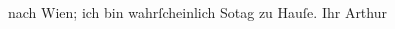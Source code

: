 \begin{ledgroupsized}[t]{13cm}
                    nach Wien; ich bin wahrſcheinlich So{\geminationn}tag zu Hauſe.\pend
           \pstart Ihr \spacefill\mbox{Arthur}\pend{}\pstart
           \noindent{}\label{T_L00842_1v}\label{T_L00842_1h}\pend
           \endnumbering{}\end{ledgroupsized}  \newcommand{\dateiname}{L00842}\newcommand{\titel}{Arthur Schnitzler an Hugo von Hofmannsthal, 31. 8. 1898}\newcommand{\editorInnen}{Martin Anton Müller und Gerd-Hermann Susen}
            \footnotesize
\begin{ledgroupsized}[t]{11.5cm}
\end{ledgroupsized}
         
      